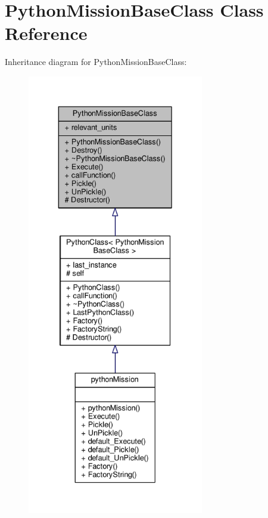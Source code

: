 \hypertarget{classPythonMissionBaseClass}{}\section{Python\+Mission\+Base\+Class Class Reference}
\label{classPythonMissionBaseClass}


Inheritance diagram for Python\+Mission\+Base\+Class\+:
\nopagebreak
\begin{figure}[H]
\begin{center}
\leavevmode
\includegraphics[height=550pt]{d6/d42/classPythonMissionBaseClass__inherit__graph}
\end{center}
\end{figure}


